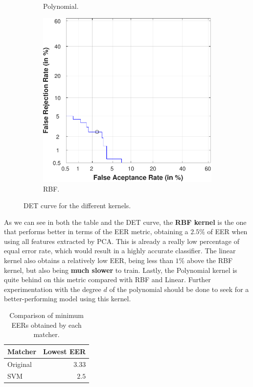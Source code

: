 \documentclass[a4paper]{article}
\begin{document}
\begin{figure}[H]
\begin{subfigure}[t]{0.32\textwidth}
           \caption{Polynomial.}
       \end{subfigure}
       \quad
       \begin{subfigure}[t]{0.32\textwidth}
        \centering
        \includegraphics[scale=0.4]{Figures/SVM-RBF}
        \caption{RBF.}
    \end{subfigure}%
      \caption{DET curve for the different kernels.}
      \label{fig:extra:all}
  \end{figure}

As we can see in both the table and the DET curve, the \textbf{RBF kernel} is the one that performs better in terms of the EER metric, obtaining a \(2.5\%\) of EER when using all features extracted by PCA. This is already a really low percentage of equal error rate, which would result in a highly accurate classifier. The linear kernel also obtains a relatively low EER, being less than \(1\%\) above the RBF kernel, but also being \textbf{much slower} to train. Lastly, the Polynomial kernel is quite behind on this metric compared with RBF and Linear. Further experimentation with the degree \(d\) of the polynomial should be done to seek for a better-performing model using this kernel.\\


\begin{table}[H]
  \centering
  \begin{tabular}{l|r}
  Matcher  & \multicolumn{1}{l}{Lowest EER} \\ \hline
  Original & $3.33$                         \\
  SVM      & $2.5$                         
  \end{tabular}
  \caption{Comparison of minimum EERs obtained by each matcher.}
  \label{table:extra:comp}
  \end{table}
\end{document}
